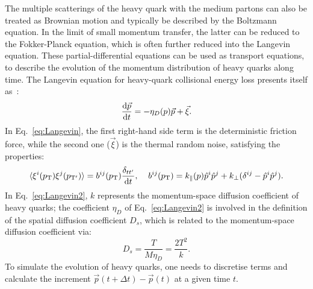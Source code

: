 The multiple scatterings of the heavy quark with the medium 
partons can also be treated as Brownian motion and typically
be described by the Boltzmann equation. In the limit of small 
momentum transfer, the latter can be reduced to the 
Fokker-Planck equation, which is often further reduced into the
Langevin equation. These
partial-differential equations can be used as transport equations, 
to describe the evolution of the momentum distribution
of heavy quarks along time. The Langevin equation for heavy-quark 
collisional energy loss presents itself as~\cite{Cao:2013ita}:
\begin{equation}
\label{eq:Langevin}
\frac{{\rm d} {\vec{p}}}{{\rm d} t} = - \eta_D (p) \vec{p} + \vec{\xi}.
\end{equation}
In Eq.~\ref{eq:Langevin}, the first right-hand side term is the 
deterministic friction force, while the second one ($ \vec{\xi}$) is the thermal random noise,
satisfying the properties:
\begin{equation}
\label{eq:Langevin2}
\langle {\xi^i (p_{\rm T})} {\xi^j (p_{\rm T'})} \rangle = b^{ij} (p_{\rm T}) \frac{\delta_{tt'}}{{\rm d} t}, \; \; \; \; b^{ij} (p_{\rm T}) = k_{\parallel}(p)\hat{p}^i\hat{p}^j + k_{\perp} (\delta^{ij} - \hat{p}^i\hat{p}^j).
\end{equation}
In Eq.~\ref{eq:Langevin2}, $k$ represents the momentum-space 
diffusion coefficient of heavy quarks;
the coefficient $\eta_D$ of Eq.~\ref{eq:Langevin2} is involved in the definition of the spatial 
diffusion coefficient $D_s$, which is related to the momentum-space 
diffusion coefficient via: 
\begin{equation}
\label{eq:Langevin3}
D_s = \frac{T}{M \eta_D} = \frac{2 T^2}{k}.
\end{equation}
To simulate the evolution of heavy quarks, one needs to discretise terms and calculate the increment 
$\vec{p}(t + \Delta t) -  \vec{p}(t)$ at a given time $t$. 

